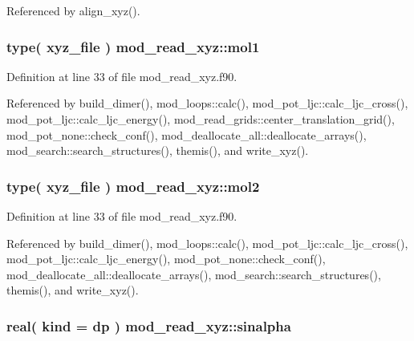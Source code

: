 Referenced by align\+\_\+xyz().

\subsubsection[{\texorpdfstring{mol1}{mol1}}]{\setlength{\rightskip}{0pt plus 5cm}type( {\bf xyz\+\_\+file} ) mod\+\_\+read\+\_\+xyz\+::mol1}\hypertarget{namespacemod__read__xyz_a4f9bfbc2e65fbc70f98f0dd5482a86f0}{}\label{namespacemod__read__xyz_a4f9bfbc2e65fbc70f98f0dd5482a86f0}


Definition at line 33 of file mod\+\_\+read\+\_\+xyz.\+f90.



Referenced by build\+\_\+dimer(), mod\+\_\+loops\+::calc(), mod\+\_\+pot\+\_\+ljc\+::calc\+\_\+ljc\+\_\+cross(), mod\+\_\+pot\+\_\+ljc\+::calc\+\_\+ljc\+\_\+energy(), mod\+\_\+read\+\_\+grids\+::center\+\_\+translation\+\_\+grid(), mod\+\_\+pot\+\_\+none\+::check\+\_\+conf(), mod\+\_\+deallocate\+\_\+all\+::deallocate\+\_\+arrays(), mod\+\_\+search\+::search\+\_\+structures(), themis(), and write\+\_\+xyz().

\subsubsection[{\texorpdfstring{mol2}{mol2}}]{\setlength{\rightskip}{0pt plus 5cm}type( {\bf xyz\+\_\+file} ) mod\+\_\+read\+\_\+xyz\+::mol2}\hypertarget{namespacemod__read__xyz_ad6455b07e3bcbb980fd81f7a6a61d835}{}\label{namespacemod__read__xyz_ad6455b07e3bcbb980fd81f7a6a61d835}


Definition at line 33 of file mod\+\_\+read\+\_\+xyz.\+f90.



Referenced by build\+\_\+dimer(), mod\+\_\+loops\+::calc(), mod\+\_\+pot\+\_\+ljc\+::calc\+\_\+ljc\+\_\+cross(), mod\+\_\+pot\+\_\+ljc\+::calc\+\_\+ljc\+\_\+energy(), mod\+\_\+pot\+\_\+none\+::check\+\_\+conf(), mod\+\_\+deallocate\+\_\+all\+::deallocate\+\_\+arrays(), mod\+\_\+search\+::search\+\_\+structures(), themis(), and write\+\_\+xyz().

\subsubsection[{\texorpdfstring{sinalpha}{sinalpha}}]{\setlength{\rightskip}{0pt plus 5cm}real( kind = dp ) mod\+\_\+read\+\_\+xyz\+::sinalpha}\hypertarget{namespacemod__read__xyz_a97d484f8583bf1d60e6d02230e28feb3}{}\label{namespacemod__read__xyz_a97d484f8583bf1d60e6d02230e28feb3}


